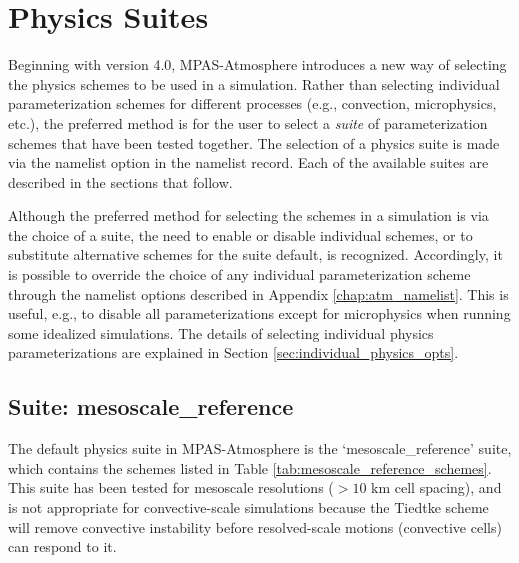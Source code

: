 \chapter{Physics Suites}
\label{chap:phys_suites}

Beginning with version 4.0, MPAS-Atmosphere introduces a new way of selecting the physics schemes to be used in a simulation. Rather than selecting individual parameterization schemes for different processes (e.g., convection, microphysics, etc.), the preferred method is for the user to select a {\em suite} of parameterization schemes that have been tested together. The selection of a physics suite is made via the namelist option  in the  namelist record. Each of the available suites are described in the sections that follow.

Although the preferred method for selecting the schemes in a simulation is via the choice of a suite, the need to enable or disable individual schemes, or to substitute alternative schemes for the suite default, is recognized. Accordingly, it is possible to override the choice of any individual parameterization scheme through the namelist options described in Appendix \ref{chap:atm_namelist}. This is useful, e.g., to disable all parameterizations except for microphysics when running some idealized simulations. The details of selecting individual physics parameterizations are explained in Section \ref{sec:individual_physics_opts}.


\section{Suite: mesoscale\_reference}
\label{sec:phys_mesoscale_reference} 

The default physics suite in MPAS-Atmosphere is the `mesoscale\_reference' suite, which contains the schemes listed in Table \ref{tab:mesoscale_reference_schemes}. This suite has been tested for mesoscale resolutions ($>10$ km cell spacing), and is not appropriate for convective-scale simulations because the Tiedtke scheme will remove convective instability before resolved-scale motions (convective cells) can respond to it.

